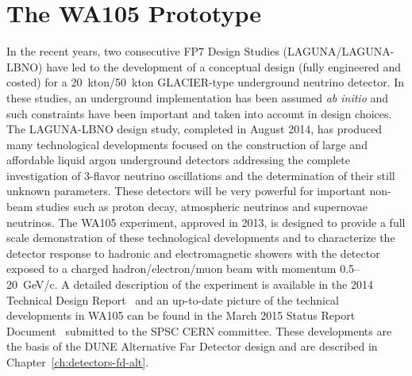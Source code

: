 \section{The WA105 Prototype} 
\label{sec:proto-cern-double}

In the recent years, two consecutive FP7 Design Studies
(LAGUNA/LAGUNA-LBNO) have led to the development of a conceptual
design (fully engineered and costed) for a 20~kton/50~kton GLACIER-type
underground neutrino detector. In these studies, an underground
implementation has been assumed {\it ab initio} and such constraints
have been important and taken into account in design choices. The
LAGUNA-LBNO design study, completed in August 2014, has produced many
technological developments focused on the construction of large and
affordable liquid argon underground detectors addressing the complete
investigation of 3-flavor neutrino oscillations and the determination
of their still unknown parameters. These detectors will be very
powerful for important non-beam studies such as proton decay,
atmospheric neutrinos and supernovae neutrinos. The WA105 experiment,
approved in 2013, is designed to provide a full scale demonstration of
these technological developments and to characterize the detector
response to hadronic and electromagnetic showers with the detector
exposed to a charged hadron/electron/muon beam with momentum
0.5--20~GeV/c. A detailed description of the experiment is available
in the 2014 Technical Design Report~\cite{WA105_TDR} and an up-to-date
picture of the technical developments in WA105 can be found in the
March 2015 Status Report Document~\cite{WA105_SREP} submitted to the
SPSC CERN committee. These developments are the basis of the DUNE
Alternative Far Detector design and are described in
Chapter~\ref{ch:detectors-fd-alt}.

